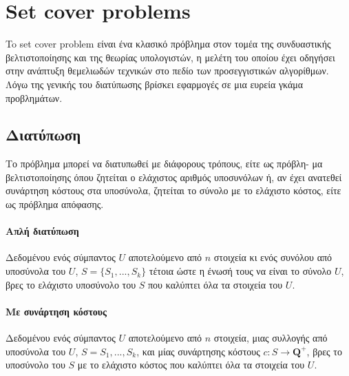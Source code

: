 
\chapter{Set cover problems} %

\label{Chapter1} %
\begin{sloppypar}

To set cover problem είναι ένα κλασικό πρόβλημα στον τομέα της συνδυαστικής βελτιστοποίησης και της θεωρίας υπολογιστών, 
η μελέτη του οποίου έχει οδηγήσει στην ανάπτυξη θεμελιωδών τεχνικών στο πεδίο των προσεγγιστικών αλγορίθμων. 
Λόγω της γενικής του διατύπωσης βρίσκει εφαρμογές σε μια ευρεία γκάμα προβλημάτων.
\end{sloppypar}


\section{Διατύπωση}
Το πρόβλημα μπορεί να διατυπωθεί με διάφορους τρόπους, είτε ως πρόβλη- μα βελτιστοποίησης όπου ζητείται ο ελάχιστος αριθμός υποσυνόλων ή, αν έχει ανατεθεί συνάρτηση κόστους στα υποσύνολα, ζητείται το σύνολο με το ελάχιστο κόστος, είτε ως πρόβλημα απόφασης. 


\subsubsection{Απλή διατύπωση}
Δεδομένου ενός σύμπαντος $U$ αποτελούμενο από $n$ στοιχεία κι ενός συνόλου από υποσύνολα του $U$, $S = \{S_1,...,S_k\}$ τέτοια ώστε η ένωσή τους να είναι το σύνολο $U$, βρες το ελάχιστο υποσύνολο του $S$ που καλύπτει όλα τα στοιχεία του $U$.

\subsubsection{Με συνάρτηση κόστους}
Δεδομένου ενός σύμπαντος $U$ αποτελούμενο από $n$ στοιχεία, μιας συλλογής από υποσύνολα του $U$, $S = {S_1,...,S_k}$, και μίας συνάρτησης κόστους $c : S \rightarrow {\boldsymbol{Q}^+}$, βρες το υποσύνολο του $S$ με το ελάχιστο κόστος που καλύπτει όλα τα στοιχεία του $U$.

